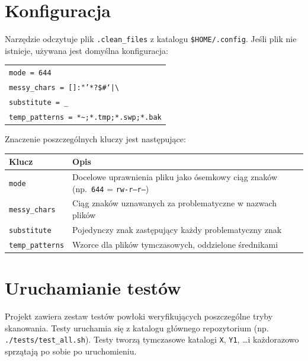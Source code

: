\documentclass[12pt, a4paper]{article}
\begin{document}
\section*{Konfiguracja}
Narzędzie odczytuje plik \texttt{.clean\_files} z katalogu
\texttt{\$HOME/.config}. Jeśli plik nie istnieje, używana jest domyślna
konfiguracja:

\begin{center}
	\begin{tabular}{l}
		\texttt{mode = 644}                                    \\
		\texttt{messy\_chars = []:"'*?\$\#`|\textbackslash{} } \\
		\texttt{substitute = \_}                               \\
		\texttt{temp\_patterns = *\textasciitilde{};*.tmp;*.swp;*.bak}
	\end{tabular}
\end{center}

Znaczenie poszczególnych kluczy jest następujące:
\begin{table}[H]
	\begin{tabularx}{\textwidth}{|l|X|}
		\hline
		\textbf{Klucz}          & \textbf{Opis}                                                                                 \\
		\hline
		\texttt{mode}           & Docelowe uprawnienia pliku jako ósemkowy ciąg znaków (np.\ \texttt{644} = \texttt{rw-r--r--}) \\
		\hline
		\texttt{messy\_chars}   & Ciąg znaków uznawanych za problematyczne w nazwach plików                                     \\
		\hline
		\texttt{substitute}     & Pojedynczy znak zastępujący każdy problematyczny znak                                         \\
		\hline
		\texttt{temp\_patterns} & Wzorce dla plików tymczasowych, oddzielone średnikami                                         \\
		\hline
	\end{tabularx}
\end{table}

\section*{Uruchamianie testów}
Projekt zawiera zestaw testów powłoki weryfikujących poszczególne tryby
skanowania. Testy uruchamia się z katalogu głównego repozytorium (np.
\texttt{./tests/test\_all.sh}). Testy tworzą tymczasowe katalogi \texttt{X},
\texttt{Y1}, \dots i każdorazowo sprzątają po sobie po uruchomieniu.
\end{document}
